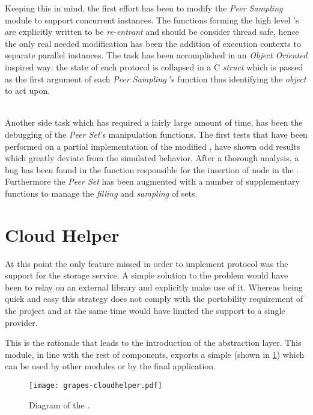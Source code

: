 Keeping this in mind, the first effort has been to modify the
\emph{Peer Sampling} module to support concurrent instances. The
functions forming the high level \grapes's \api are explicitly written
to be \emph{re-entrant} and should be consider thread safe, hence the only
real needed modification has been the addition of execution contexts to
separate parallel instances. The task has been accomplished in an
\emph{Object Oriented} inspired way: the state of each protocol is
collapsed in a C \emph{struct} which is passed as the first
argument of each \textit{Peer Sampling} \api's function thus identifying
the \emph{object} to act upon.

\ \\
Another side task which has required a fairly large amount of time, has
been the debugging of the \textit{Peer Set}'s manipulation functions. The
first tests that have been performed on a partial implementation of
the modified
\cyclon, have shown odd results which greatly deviate from the simulated
behavior. After a thorough analysis, a bug has been found in the function
responsible for the insertion of node \descriptors in the \view.
Furthermore the \textit{Peer Set} \api has been augmented with a number of
supplementary functions to manage the \emph{filling} and
\emph{sampling} of sets.

\section{Cloud Helper}
At this point the only feature \grapes missed in order to implement
\cloudcast \peersampling protocol was the support for the storage
service. A simple solution to the problem would have been to
relay on an external library and explicitly make use of it. Whereas
being quick and easy this strategy does not comply with the
portability requirement of the project and at the same time would have
limited the \cloud support to a single provider.

This is the rationale that leads to the introduction of the
\cloudhelper abstraction layer. This module, in line with the rest of
\grapes components, exports a simple \api (shown in
\ref{fig:grapes-cloudhelper}) which can be used by other
modules or by the final application.

\begin{figure}[H]
  \centering
  \texttt{[image: grapes-cloudhelper.pdf]}
  \caption{Diagram of the \cloudhelper \api.}
  \label{fig:grapes-cloudhelper}
\end{figure}

